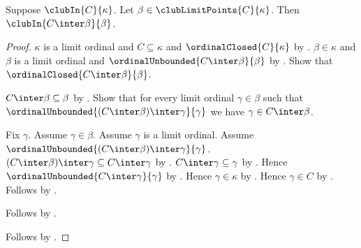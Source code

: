 \begin{theorem}\label{club_restrict_at_limit_point}
    Suppose $\clubIn{C}{\kappa}$.
    Let $\beta\in\clubLimitPoints{C}{\kappa}$.
    Then $\clubIn{C\inter\beta}{\beta}$.
\end{theorem}
\begin{proof}
    $\kappa$ is a limit ordinal and $C\subseteq\kappa$ and
        $\ordinalClosed{C}{\kappa}$ by .
    $\beta\in\kappa$ and $\beta$ is a limit ordinal and
        $\ordinalUnbounded{C\inter\beta}{\beta}$
        by .
    Show that $\ordinalClosed{C\inter\beta}{\beta}$.
    \begin{subproof}
        $C\inter\beta\subseteq\beta$ by .
        Show that for every limit ordinal $\gamma\in\beta$ such that
            $\ordinalUnbounded{(C\inter\beta)\inter\gamma}{\gamma}$
            we have $\gamma\in C\inter\beta$.
        \begin{subproof}
            Fix $\gamma$.
            Assume $\gamma\in\beta$.
            Assume $\gamma$ is a limit ordinal.
            Assume $\ordinalUnbounded{(C\inter\beta)\inter\gamma}{\gamma}$.
            $(C\inter\beta)\inter\gamma\subseteq C\inter\gamma$
                by .
            $C\inter\gamma\subseteq\gamma$ by .
            Hence $\ordinalUnbounded{C\inter\gamma}{\gamma}$
                by .
            Hence $\gamma\in\kappa$ by .
            Hence $\gamma\in C$ by .
            Follows by .
        \end{subproof}
        Follows by .
    \end{subproof}
    Follows by .
\end{proof}


